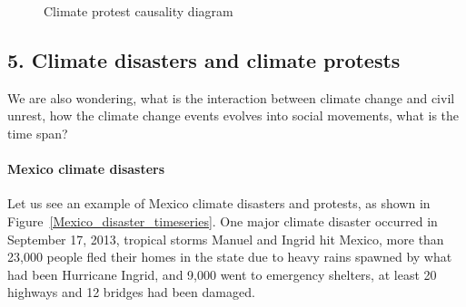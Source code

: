 \documentclass[9pt,twocolumn,twoside]{pnas-new}
\begin{document}
\begin{figure}[ht]
	\centering
	\caption{Climate protest causality diagram}
\label{three-causality}
\end{figure}



\subsection{5. Climate disasters and climate protests}
We are also wondering, what is the interaction between climate change and civil unrest, how the climate change events evolves into social movements, what is the time span?

\paragraph{Mexico climate disasters}
Let us see an example of Mexico climate disasters and protests, as shown in Figure~\ref{Mexico_disaster_timeseries}. One major climate disaster occurred in September 17, 2013, tropical storms Manuel and Ingrid hit Mexico, more than 23,000 people fled their homes in the state due to heavy rains spawned by what had been Hurricane Ingrid, and 9,000 went to emergency shelters, at least 20 highways and 12 bridges had been damaged.
\end{document}
